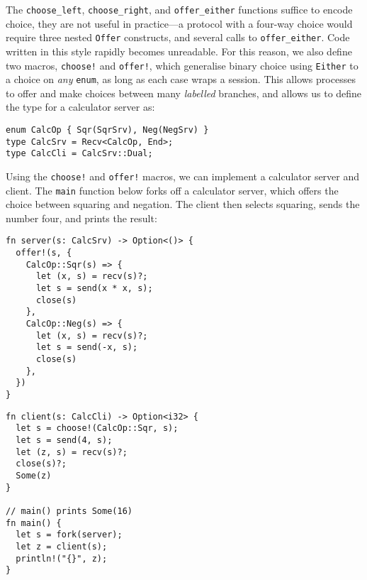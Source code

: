 \documentclass[copyright,creativecommons]{eptcs}
\begin{document}
The \lstinline{choose_left}, \lstinline{choose_right}, and \lstinline{offer_either} functions suffice to encode choice, they are not useful in practice---a protocol with a four-way choice would require three nested \lstinline{Offer} constructs, and several calls to \lstinline{offer_either}. Code written in this style rapidly becomes unreadable. For this reason, we also define two macros, \lstinline{choose!} and \lstinline{offer!}, which generalise binary choice using \lstinline{Either} to a choice on \emph{any} \lstinline{enum}, as long as each case wraps a session. This allows processes to offer and make choices between many \emph{labelled} branches, and allows us to define the type for a calculator server as:
\begin{lstlisting}
enum CalcOp { Sqr(SqrSrv), Neg(NegSrv) }
type CalcSrv = Recv<CalcOp, End>;
type CalcCli = CalcSrv::Dual;
\end{lstlisting}
Using the \lstinline{choose!} and \lstinline{offer!} macros, we can implement a calculator server and client. The \lstinline{main} function below forks off a calculator server, which offers the choice between squaring and negation. The client then selects squaring, sends the number four, and prints the result:

\begin{minipage}[t]{0.5\linewidth}
\begin{lstlisting}
fn server(s: CalcSrv) -> Option<()> {
  offer!(s, {
    CalcOp::Sqr(s) => {
      let (x, s) = recv(s)?;
      let s = send(x * x, s);
      close(s)
    },
    CalcOp::Neg(s) => {
      let (x, s) = recv(s)?;
      let s = send(-x, s);
      close(s)
    },
  })
}
\end{lstlisting}
\end{minipage}%
\begin{minipage}[t]{0.5\linewidth}
\begin{lstlisting}
fn client(s: CalcCli) -> Option<i32> {
  let s = choose!(CalcOp::Sqr, s);
  let s = send(4, s);
  let (z, s) = recv(s)?;
  close(s)?;
  Some(z)
}

// main() prints Some(16)
fn main() {
  let s = fork(server);
  let z = client(s);
  println!("{}", z);
}
\end{lstlisting}
\end{minipage}
\vspace{-0.25\baselineskip}
\end{document}
